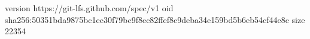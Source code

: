 version https://git-lfs.github.com/spec/v1
oid sha256:50351bda9875bc1ec30f79bc9f8ec82ffef8c9deba34e159bd5b6eb54cf44e8c
size 22354
